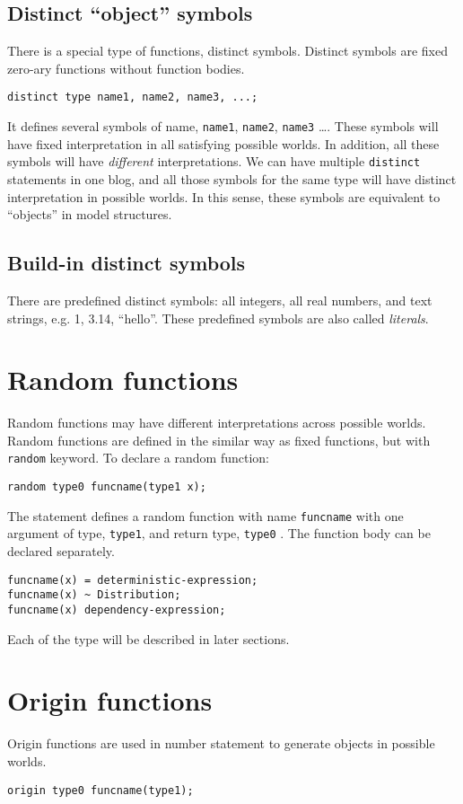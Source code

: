 \documentclass[12pt]{article}
\begin{document}
\subsection{Distinct ``object'' symbols}
There is a special type of functions, distinct symbols. 
Distinct symbols are fixed zero-ary functions without function bodies.
\begin{verbatim}
distinct type name1, name2, name3, ...;
\end{verbatim}
It defines several symbols of name, \texttt{name1}, \texttt{name2}, \texttt{name3} \dots.
These symbols will have fixed interpretation in all satisfying possible worlds. In addition, all these symbols will have \emph{different} interpretations. 
We can have multiple \texttt{distinct} statements in one blog, and all those symbols for the same type will have 
distinct interpretation in possible worlds. In this sense, these symbols are equivalent to ``objects'' in model structures. 

\subsection{Build-in distinct symbols}
There are predefined distinct symbols: all integers, all real numbers, and text strings, e.g. 1, 3.14, ``hello''. These predefined symbols are also called {\em literals}.


\section{Random functions}
Random functions may have different interpretations across possible worlds. Random functions are defined in the similar way as fixed functions, but with \texttt{random} keyword.
To declare a random function:
\begin{verbatim}
random type0 funcname(type1 x);
\end{verbatim}
The statement defines a random function with name \texttt{funcname} with one argument of type, \texttt{type1}, and return type, \texttt{type0} . The function body can be declared separately. 
\begin{verbatim}
funcname(x) = deterministic-expression;
funcname(x) ~ Distribution;
funcname(x) dependency-expression;
\end{verbatim}
 Each of the type will be described in later sections.


\section{Origin functions}
Origin functions are used in number statement to generate objects in possible worlds. 
\begin{verbatim}
origin type0 funcname(type1);
\end{verbatim}
\end{document}
